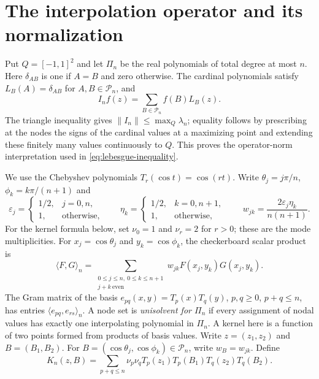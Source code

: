 \section{The interpolation operator and its normalization}\label{sec:preliminaries}
Put $Q=[-1,1]^2$ and let $\Pi_n$ be the real polynomials of total degree
at most $n$. Here $\delta_{AB}$ is one if $A=B$ and zero otherwise.
The cardinal polynomials satisfy $L_B(A)=\delta_{AB}$ for
$A,B\in\mathcal P_n$, and
\[
 I_nf(z)=\sum_{B\in\mathcal P_n} f(B)L_B(z).
\]
The triangle inequality gives $\|I_n\|\leq\max_Q\lambda_n$; equality
follows by prescribing at the nodes the signs of the cardinal values
at a maximizing point and extending these finitely many values
continuously to $Q$. This proves the operator-norm interpretation used
in \eqref{eq:lebesgue-inequality}.

We use the Chebyshev polynomials $T_r(\cos t)=\cos(rt)$. Write
$\theta_j=j\pi/n$, $\phi_k=k\pi/(n+1)$ and
\[
 \varepsilon_j=\begin{cases}1/2,&j=0,n,\\1,&\text{otherwise},\end{cases}
 \qquad
 \eta_k=\begin{cases}1/2,&k=0,n+1,\\1,&\text{otherwise},\end{cases}
 \qquad w_{jk}=\frac{2\varepsilon_j\eta_k}{n(n+1)}.
\]
For the kernel formula below, set $\nu_0=1$ and $\nu_r=2$ for $r>0$;
these are the mode multiplicities. For $x_j=\cos\theta_j$ and
$y_k=\cos\phi_k$, the checkerboard scalar product is
\[
 \langle F,G\rangle_n=
 \sum_{\substack{0\leq j\leq n,\ 0\leq k\leq n+1\\j+k\ \mathrm{even}}}
 w_{jk}F(x_j,y_k)G(x_j,y_k).
\]
The Gram matrix of the basis $e_{pq}(x,y)=T_p(x)T_q(y)$,
$p,q\geq0$, $p+q\leq n$, has entries
$\langle e_{pq},e_{rs}\rangle_n$.
A node set is \emph{unisolvent for $\Pi_n$} if every assignment of
nodal values has exactly one interpolating polynomial in $\Pi_n$.
A kernel here is a function of two points formed from products of basis
values. Write $z=(z_1,z_2)$ and $B=(B_1,B_2)$. For
$B=(\cos\theta_j,\cos\phi_k)\in\mathcal P_n$, write $w_B=w_{jk}$. Define
\[
 K_n(z,B)=\sum_{p+q\leq n}\nu_p\nu_q
 T_p(z_1)T_p(B_1)T_q(z_2)T_q(B_2).
\]

